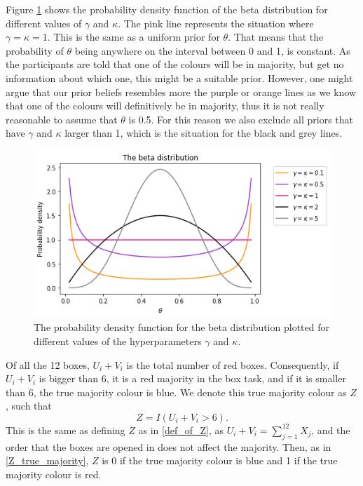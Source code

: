 Figure \ref{fig:pdf_beta_distr} shows the probability density function of the beta distribution for different values of $\gamma$ and $\kappa$. The pink line represents the situation where $\gamma=\kappa=1$. This is the same as a uniform prior for $\theta$. That means that the probability of $\theta$ being anywhere on the interval between 0 and 1, is constant. As the participants are told that one of the colours will be in majority, but get no information about which one, this might be a suitable prior.
However, one might argue that our prior beliefs resembles more the purple or orange lines as we know that one of the colours will definitively be in majority, thus it is not really reasonable to assume that $\theta$ is 0.5. For this reason we also exclude all priors that have $\gamma$ and $\kappa$ larger than 1, which is the situation for the black and grey lines. 

\begin{figure}
    \centering
    \includegraphics[scale=0.5]{pictures/beta_pdf.png}
    \caption[Probability Density for the Beta Distribution]{The probability density function for the beta distribution plotted for different values of the hyperparameters $\gamma$ and $\kappa$.}
    \label{fig:pdf_beta_distr}
\end{figure}


Of all the 12 boxes, $U_i+V_i$ is the total number of red boxes.
Consequently, if $U_i+V_i$ is bigger than 6, it is a red majority in the box task, and if it is smaller than 6, the true majority colour is blue. We denote this true majority colour as $Z$, such that
\begin{equation}
\label{def_of_Z_2}
    Z = I(U_i+V_i>6).
\end{equation}
This is the same as defining $Z$ as in \eqref{def_of_Z}, as $U_i+V_i = \sum_{j=1}^{12}X_j$, and the order that the boxes are opened in does not affect the majority. Then, as in \eqref{Z_true_majority}, $Z$ is 0 if the true majority colour is blue and 1 if the true majority colour is red. 


